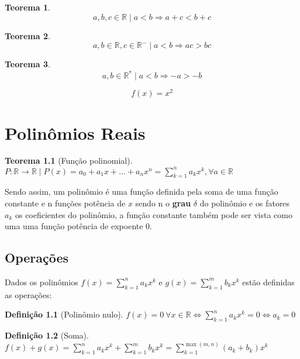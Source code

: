 \documentclass[
]{book}
\newtheorem{theorem}{Teorema}[chapter]
\theoremstyle{definition}
\newtheorem{definition}{Definição}[chapter]
\theoremstyle{definition}
\theoremstyle{definition}
\theoremstyle{definition}
\theoremstyle{remark}
\begin{document}
\begin{theorem}
\protect\hypertarget{thm:thmordtrans}{}\label{thm:thmordtrans}\[
a, b, c \in \mathbb{R} \mid a < b \Rightarrow a+c < b+c
\]
\end{theorem}

\begin{theorem}
\protect\hypertarget{thm:thmordmulti}{}\label{thm:thmordmulti}\[
a, b \in \mathbb{R}, c \in \mathbb{R}^- \mid a < b \Rightarrow ac > bc
\]
\end{theorem}

\begin{theorem}
\protect\hypertarget{thm:thmordinv}{}\label{thm:thmordinv}\[
a, b \in \mathbb{R}^* \mid a < b \Rightarrow -a > -b
\]
\end{theorem}

\[
f(x) = x^2
\]

\chapter{Polinômios Reais}\label{polinuxf4mios-reais}

\begin{theorem}[Função polinomial]
\(P: \mathbb{R} \rightarrow \mathbb{R} \mid P(x) = a_0 + a_1x + \dots + a_nx^n = \sum_{k=1}^n a_kx^k, \forall a \in \mathbb{R}\)
\end{theorem}

Sendo assim, um polinômio é uma função definida pela soma de uma função constante e n funções potência de \(x\) sendo n o \textbf{grau} \(\delta\) do polinômio e os fatores \(a_k\) os coeficientes do polinômio, a função constante também pode ser vista como uma uma função potência de expoente 0.

\section{Operações}\label{operauxe7uxf5es}

Dados os polinômios \(f(x) = \sum_{k=1}^n a_kx^k\) e \(g(x) = \sum_{k=1}^m b_kx^k\) estão definidas as operações:

\begin{definition}[Polinômio nulo]
\protect\hypertarget{def:polinomionulo}{}\label{def:polinomionulo}\(f(x) = 0 \ \forall x \in \mathbb{R} \Leftrightarrow  \sum_{k=1}^n a_kx^k = 0 \Leftrightarrow a_k = 0\)
\end{definition}

\begin{definition}[Soma]
\protect\hypertarget{def:somapolinomio}{}\label{def:somapolinomio}\(f(x) + g(x) = \sum_{k=1}^n a_kx^k + \sum_{k=1}^m b_kx^k = \sum_{k=1}^{\max(m,n)} (a_k + b_k)x^k\)
\end{definition}
\end{document}
